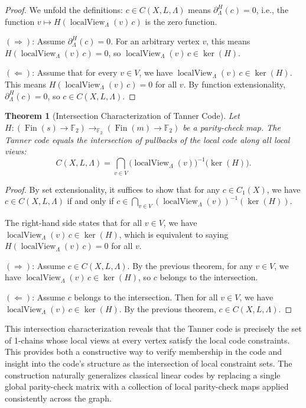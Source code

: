 \documentclass[11pt]{article}
\theoremstyle{plain}
\newtheorem*{theorem}{Theorem}
\theoremstyle{definition}
\theoremstyle{remark}
\renewcommand{\ker}{\operatorname{ker}}
\begin{document}
\begin{proof}
We unfold the definitions: $c \in C(X, L, \Lambda)$ means $\partial_\Lambda^H(c) = 0$, i.e., the function $v \mapsto H(\operatorname{localView}_\Lambda(v)\,c)$ is the zero function.

$(\Rightarrow)$: Assume $\partial_\Lambda^H(c) = 0$. For an arbitrary vertex $v$, this means $H(\operatorname{localView}_\Lambda(v)\,c) = 0$, so $\operatorname{localView}_\Lambda(v)\,c \in \ker(H)$.

$(\Leftarrow)$: Assume that for every $v \in V$, we have $\operatorname{localView}_\Lambda(v)\,c \in \ker(H)$. This means $H(\operatorname{localView}_\Lambda(v)\,c) = 0$ for all $v$. By function extensionality, $\partial_\Lambda^H(c) = 0$, so $c \in C(X, L, \Lambda)$.
\end{proof}

\begin{theorem}[Intersection Characterization of Tanner Code]
Let $H : (\operatorname{Fin}(s) \to \mathbb{F}_2) \to_{\mathbb{F}_2} (\operatorname{Fin}(m) \to \mathbb{F}_2)$ be a parity-check map. The Tanner code equals the intersection of pullbacks of the local code along all local views:
\[
C(X, L, \Lambda) = \bigcap_{v \in V} \bigl(\operatorname{localView}_\Lambda(v)\bigr)^{-1}\!\bigl(\ker(H)\bigr).
\]
\end{theorem}

\begin{proof}
By set extensionality, it suffices to show that for any $c \in C_1(X)$, we have $c \in C(X, L, \Lambda)$ if and only if $c \in \bigcap_{v \in V} (\operatorname{localView}_\Lambda(v))^{-1}(\ker(H))$.

The right-hand side states that for all $v \in V$, we have $\operatorname{localView}_\Lambda(v)\,c \in \ker(H)$, which is equivalent to saying $H(\operatorname{localView}_\Lambda(v)\,c) = 0$ for all $v$.

$(\Rightarrow)$: Assume $c \in C(X, L, \Lambda)$. By the previous theorem, for any $v \in V$, we have $\operatorname{localView}_\Lambda(v)\,c \in \ker(H)$, so $c$ belongs to the intersection.

$(\Leftarrow)$: Assume $c$ belongs to the intersection. Then for all $v \in V$, we have $\operatorname{localView}_\Lambda(v)\,c \in \ker(H)$. By the previous theorem, $c \in C(X, L, \Lambda)$.
\end{proof}

This intersection characterization reveals that the Tanner code is precisely the set of 1-chains whose local views at every vertex satisfy the local code constraints. This provides both a constructive way to verify membership in the code and insight into the code's structure as the intersection of local constraint sets. The construction naturally generalizes classical linear codes by replacing a single global parity-check matrix with a collection of local parity-check maps applied consistently across the graph.
\end{document}
